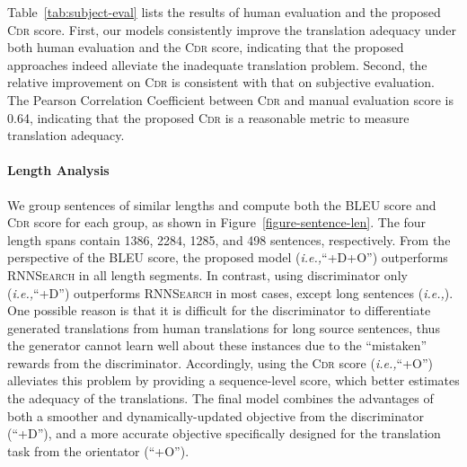 \documentclass[letterpaper]{article} \usepackage{aaai19}  \usepackage{times}  \usepackage{helvet}  \usepackage{courier}  \usepackage{url}  \usepackage{graphicx}  \frenchspacing  \setlength{\pdfpagewidth}{8.5in}  \setlength{\pdfpageheight}{11in}  \usepackage{amsmath}
\begin{document}
Table~\ref{tab:subject-eval} lists the results of human evaluation and the proposed \textsc{Cdr} score. First, our models consistently improve the translation adequacy under both human evaluation and the \textsc{Cdr} score, indicating that the proposed approaches indeed alleviate the inadequate translation problem. Second, the relative improvement on \textsc{Cdr} is consistent with that on subjective evaluation. The Pearson Correlation Coefficient between \textsc{Cdr} and manual evaluation score is 0.64, indicating that the proposed \textsc{Cdr} is a reasonable metric to measure translation adequacy.





\paragraph{Length Analysis}

We group sentences of similar lengths and compute both the BLEU score and \textsc{Cdr} score for each group, as shown in Figure~\ref{figure-sentence-len}. 
The four length spans contain 1386, 2284, 1285, and 498 sentences, respectively.
From the perspective of the BLEU score, the proposed model (\emph{i.e.,}\xspace ``+D+O'') outperforms \textsc{RNNSearch} in all length segments. 
In contrast, using discriminator only (\emph{i.e.,}\xspace ``+D'') outperforms \textsc{RNNSearch} in most cases, except long sentences (\emph{i.e.,}\xspace ). One possible reason is that it is difficult for the discriminator to differentiate generated translations from human translations for long source sentences, thus the generator cannot learn well about these instances due to the ``mistaken'' rewards from the discriminator. 
Accordingly, using the \textsc{Cdr} score (\emph{i.e.,}\xspace ``+O'') alleviates this problem by providing a sequence-level score, which better estimates the adequacy of the translations.
The final model combines the advantages of both a smoother and dynamically-updated objective from the discriminator (``+D''), and a more accurate objective specifically designed for the translation task from the orientator (``+O''). 

\iffalse
\begin{figure}[t]
\centering
    \subfloat[BLEU Score]{\texttt{[image: figures/len-bleu.pdf]}} \\
    \subfloat[\textsc{Cdr} Score]{\texttt{[image: figures/len-cdr.pdf]}}
    \caption{BLEU and \textsc{Cdr} scores of the translations with respect to the input lengths. }\label{figure-sentence-len}
\end{figure}
\fi
\end{document}
